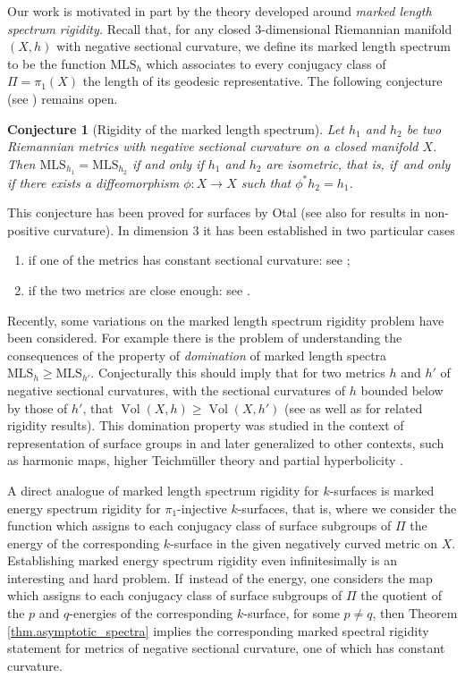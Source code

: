 \documentclass[11pt]{article}
\newcommand{\ksurface}{$k$\nobreakdash-surface\xspace}
\newcommand{\ksurfaces}{$k$\nobreakdash-surfaces\xspace}
\theoremstyle{plain}
\newtheorem{conjecture}[theorem]{Conjecture}
\theoremstyle{definition}
\newcommand{\MLS}{\mathrm{MLS}}
\DeclareMathOperator{\Vol}{Vol}
\begin{document}
Our work is motivated in part by the theory developed around \textit{marked length spectrum rigidity.} Recall that, for any closed $3$\nobreakdash-dimensional Riemannian manifold $(X,h)$ with negative sectional curvature, we define its marked length spectrum to be the function $\MLS_h$ which associates to every conjugacy class of $\Pi=\pi_1(X)$ the length of its geodesic representative. The following conjecture (see \cite[Prob.\,3.1]{BurnsKatok}) remains open.
\begin{conjecture}[Rigidity of the marked length spectrum]
Let $h_1$ and $h_2$ be two Riemannian metrics with negative sectional curvature on a closed manifold $X$. Then $\mathrm{MLS}_{h_1}=\mathrm{MLS}_{h_2}$ if and only if $h_1$ and $h_2$ are isometric, that is, if~and only if there exists a diffeomorphism $\phi:X\to X$ such that $\phi^\ast h_2=h_1$.
\end{conjecture}

This conjecture has been proved for surfaces by Otal \cite{Otal} (see also \cite{Croke} for results in non-positive curvature). In dimension $3$ it has been established in two particular cases
\begin{enumerate}
\item if one of the metrics has constant sectional curvature: see \cite{besson1996minimal,HamenstadtMLS};
\item if the two metrics are close enough: see \cite{GuillarmouLefeuvre}.
\end{enumerate}

Recently, some variations on the marked length spectrum rigidity problem have been considered. For example there is the problem of understanding the consequences of the property of \emph{domination} of marked length spectra $\MLS_h\geq\MLS_{h'}$. Conjecturally this should imply that for two metrics $h$ and $h'$ of negative sectional curvatures, with the sectional curvatures of $h$ bounded below by those of $h'$, that $\Vol(X,h)\geq\Vol(X,h')$ (see \cite{Croke_Dairbekov,Croke_Dairbekov_Sharafutdinov} as well as \cite{Gogolev_Reber} for related rigidity results). This domination property was studied in the context of representation of surface groups in \cite{Deroin_Tholozan,Gueritaud_Kassel_Wolff} and later generalized to other contexts, such as harmonic maps, higher Teichmüller theory and partial hyperbolicity \cite{Alvarez_Yang,Barman_Gupta,Dai_Li,Li,Sagman}.

A direct analogue of marked length spectrum rigidity for \ksurfaces is marked energy spectrum rigidity for $\pi_1$-injective \ksurfaces, that is, where we consider the function which assigns to each conjugacy class of surface subgroups of $\Pi$ the energy of the corresponding \ksurface in the given negatively curved metric on $X$. Establishing marked energy spectrum rigidity even infinitesimally is an interesting and hard problem. If~instead of the energy, one considers the map which assigns to each conjugacy class of surface subgroups of $\Pi$ the quotient of the $p$ and $q$-energies of the corresponding \ksurface, for some $p \neq q$, then Theorem \ref{thm.asymptotic_spectra} implies the corresponding marked spectral rigidity statement for metrics of negative sectional curvature, one of which has constant curvature.
\end{document}
